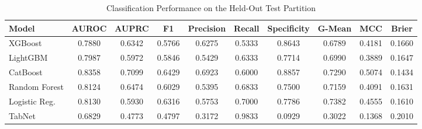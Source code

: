 \begin{table}
\centering
\caption{Classification Performance on the Held-Out Test Partition}
\label{tab:results}
\begin{tabular}{lccccccccc}
\toprule
Model & AUROC & AUPRC & F1 & Precision & Recall & Specificity & G-Mean & MCC & Brier \\
\midrule
XGBoost & 0.7880 & 0.6342 & 0.5766 & 0.6275 & 0.5333 & 0.8643 & 0.6789 & 0.4181 & 0.1660 \\
LightGBM & 0.7987 & 0.5972 & 0.5846 & 0.5429 & 0.6333 & 0.7714 & 0.6990 & 0.3889 & 0.1647 \\
CatBoost & 0.8358 & 0.7099 & 0.6429 & 0.6923 & 0.6000 & 0.8857 & 0.7290 & 0.5074 & 0.1434 \\
Random Forest & 0.8124 & 0.6474 & 0.6029 & 0.5395 & 0.6833 & 0.7500 & 0.7159 & 0.4091 & 0.1631 \\
Logistic Reg. & 0.8130 & 0.5930 & 0.6316 & 0.5753 & 0.7000 & 0.7786 & 0.7382 & 0.4555 & 0.1610 \\
TabNet & 0.6829 & 0.4773 & 0.4797 & 0.3172 & 0.9833 & 0.0929 & 0.3022 & 0.1368 & 0.2010 \\
\bottomrule
\end{tabular}
\end{table}
